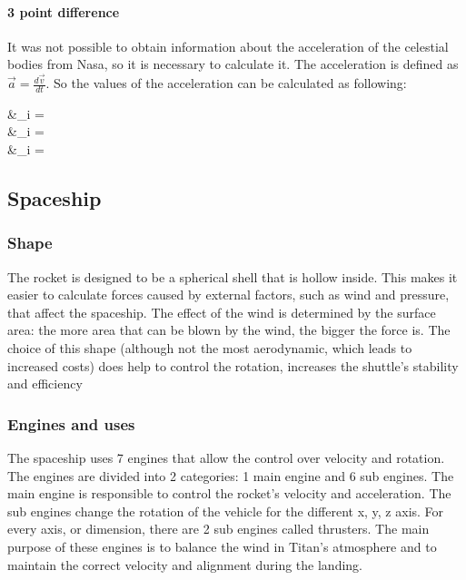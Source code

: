 \documentclass[10pt,a4paper]{article}
\begin{document}
	\paragraph{3 point difference}
	It was not possible to obtain information about the acceleration of the celestial bodies from Nasa, so it is necessary to calculate it. The acceleration is defined as $\vec{a} = \frac{d\vec{v}}{dt} $. So the values of the acceleration can be calculated as following:
	
	\begin{flalign}
	 &_i = \\
	 &_i =  \\
	 &_i = 
	\end{flalign}    
	
	\subsection{Spaceship}
	\subsubsection{Shape}
	The rocket is designed to be a spherical shell that is hollow inside. This makes it easier to calculate forces caused by external factors, such as wind and pressure, that affect the spaceship. The effect of the wind is determined by the surface area: the more area that can be blown by the wind, the bigger the force is. The choice of this shape (although not the most aerodynamic, which leads to increased costs) does help to control the rotation, increases the shuttle's stability and efficiency
	
	\subsubsection{Engines and uses}
	The spaceship uses 7 engines that allow the control over velocity and rotation. The engines are divided into 2 categories: 1 main engine and 6 sub engines. The main engine is responsible to control the rocket's velocity and acceleration. The sub engines change the rotation of the vehicle for the different x, y, z axis. For every axis, or dimension, there are 2 sub engines called thrusters. The main purpose of these engines is to balance the wind in Titan's atmosphere and to maintain the correct velocity and alignment during the landing.
	
\end{document}
